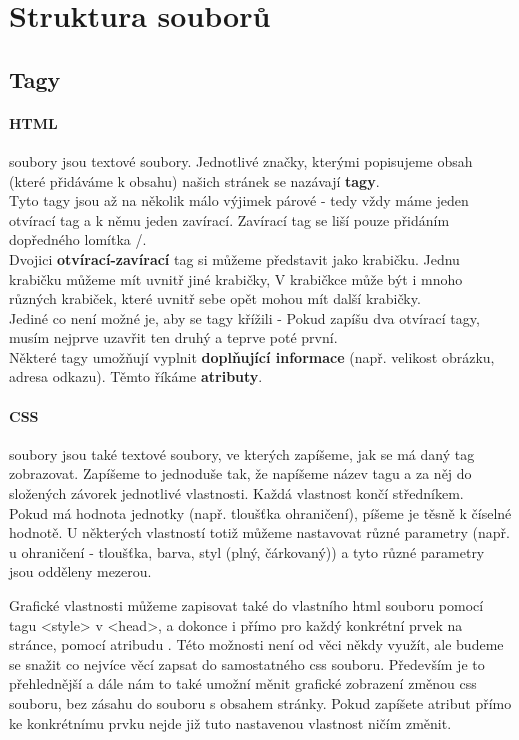 \section{Struktura souborů}
\subsection{Tagy}
\paragraph{HTML}
soubory jsou textové soubory. Jednotlivé značky, kterými popisujeme obsah (které přidáváme k obsahu) našich stránek se nazávají \textbf{tagy}.\\
Tyto tagy jsou až na několik málo výjimek párové - tedy vždy máme jeden otvírací tag a k němu jeden zavírací. Zavírací tag se liší pouze přidáním dopředného lomítka /.\\

\vspace{1cm}
Dvojici \textbf{otvírací-zavírací} tag si můžeme představit jako krabičku. Jednu krabičku můžeme mít uvnitř jiné krabičky, V krabičkce může být i mnoho různých krabiček, které uvnitř sebe opět mohou mít další krabičky.\\
Jediné co není možné je, aby se tagy křížili - Pokud zapíšu dva otvírací tagy, musím nejprve uzavřit ten druhý a teprve poté první.\\
Některé tagy umožňují vyplnit \textbf{doplňující informace} (např. velikost obrázku, adresa odkazu). Těmto  říkáme \textbf{atributy}.
\paragraph{CSS}
soubory jsou také textové soubory, ve kterých zapíšeme, jak se má daný tag zobrazovat. Zapíšeme to jednoduše tak, že napíšeme název tagu a za něj do složených závorek jednotlivé vlastnosti. Každá vlastnost končí středníkem.\\
Pokud má hodnota jednotky (např. tloušťka ohraničení), píšeme je těsně k číselné hodnotě. U některých vlastností totiž můžeme nastavovat různé parametry (např. u ohraničení - tloušťka, barva, styl (plný, čárkovaný)) a tyto různé parametry jsou odděleny mezerou.
\vspace{1cm}

Grafické vlastnosti můžeme zapisovat také do vlastního html souboru pomocí tagu <style> v <head>, a dokonce i přímo pro každý konkrétní prvek na stránce, pomocí atribudu . Této možnosti není od věci někdy využít, ale budeme se snažit co nejvíce věcí zapsat do samostatného css souboru. Především je to přehlednější a dále nám to také umožní měnit grafické zobrazení změnou css souboru, bez zásahu do souboru s obsahem stránky. Pokud zapíšete atribut  přímo ke konkrétnímu prvku nejde již tuto nastavenou vlastnost ničím změnit.

